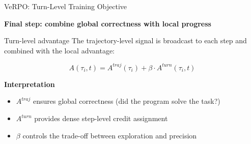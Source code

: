 \documentclass[
  english,            %
  aspectratio=169,    %
]{tumbeamer}
\begin{document}
\begin{frame}{VeRPO: Turn-Level Training Objective}

\textbf{Final step: combine global correctness with local progress}

\vspace{3mm}

\begin{block}{Turn-level advantage}
The trajectory-level signal is broadcast to each step and combined with the local advantage:
\end{block}

\vspace{-2mm}

\begin{equation}
A(\tau_i, t)
= A^{traj}(\tau_i)
+ \beta \cdot A^{turn}(\tau_i, t)
\end{equation}

\vspace{3mm}

\textbf{Interpretation}

\begin{itemize}
    \item $A^{traj}$ ensures global correctness (did the program solve the task?)
    \item $A^{turn}$ provides dense step-level credit assignment
    \item $\beta$ controls the trade-off between exploration and precision
\end{itemize}

\end{frame}
\end{document}
